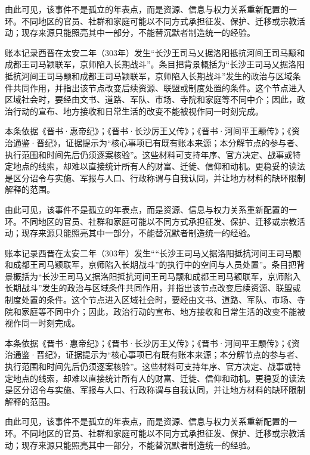 由此可见，该事件不是孤立的年表点，而是资源、信息与权力关系重新配置的一环。不同地区的官员、社群和家庭可能以不同方式承担征发、保护、迁移或宗教活动；现存来源只能照亮其中一部分，不能替沉默者制造统一的经验。

账本记录西晋在太安二年（303年）发生“长沙王司马乂据洛阳抵抗河间王司马颙和成都王司马颖联军，京师陷入长期战斗”。条目把背景概括为“长沙王司马乂据洛阳抵抗河间王司马颙和成都王司马颖联军，京师陷入长期战斗”发生的政治与区域条件共同作用，并指出该节点改变后续资源、联盟或制度处置的条件。这个节点进入区域社会时，要经由文书、道路、军队、市场、寺院和家庭等不同中介；因此，政治行动的宣布、地方接收和日常生活的改变不能被视作同一时刻完成。

本条依据《晋书·惠帝纪》；《晋书·长沙厉王乂传》；《晋书·河间平王颙传》；《资治通鉴·晋纪》，证据提示为“核心事项已有既有账本来源；本分解节点的参与者、执行范围和时间先后仍须逐案核验”。这些材料可支持年序、官方决定、战事或特定地点的线索，却难以直接统计所有人的财富、迁徙、信仰和动机。更稳妥的读法是区分诏令与实施、军报与人口、行政称谓与自我认同，并让地方材料的缺环限制解释的范围。

由此可见，该事件不是孤立的年表点，而是资源、信息与权力关系重新配置的一环。不同地区的官员、社群和家庭可能以不同方式承担征发、保护、迁移或宗教活动；现存来源只能照亮其中一部分，不能替沉默者制造统一的经验。

账本记录西晋在太安二年（303年）发生““长沙王司马乂据洛阳抵抗河间王司马颙和成都王司马颖联军，京师陷入长期战斗”的执行中的空间与人员处置”。条目把背景概括为“长沙王司马乂据洛阳抵抗河间王司马颙和成都王司马颖联军，京师陷入长期战斗”发生的政治与区域条件共同作用，并指出该节点改变后续资源、联盟或制度处置的条件。这个节点进入区域社会时，要经由文书、道路、军队、市场、寺院和家庭等不同中介；因此，政治行动的宣布、地方接收和日常生活的改变不能被视作同一时刻完成。

本条依据《晋书·惠帝纪》；《晋书·长沙厉王乂传》；《晋书·河间平王颙传》；《资治通鉴·晋纪》，证据提示为“核心事项已有既有账本来源；本分解节点的参与者、执行范围和时间先后仍须逐案核验”。这些材料可支持年序、官方决定、战事或特定地点的线索，却难以直接统计所有人的财富、迁徙、信仰和动机。更稳妥的读法是区分诏令与实施、军报与人口、行政称谓与自我认同，并让地方材料的缺环限制解释的范围。

由此可见，该事件不是孤立的年表点，而是资源、信息与权力关系重新配置的一环。不同地区的官员、社群和家庭可能以不同方式承担征发、保护、迁移或宗教活动；现存来源只能照亮其中一部分，不能替沉默者制造统一的经验。

